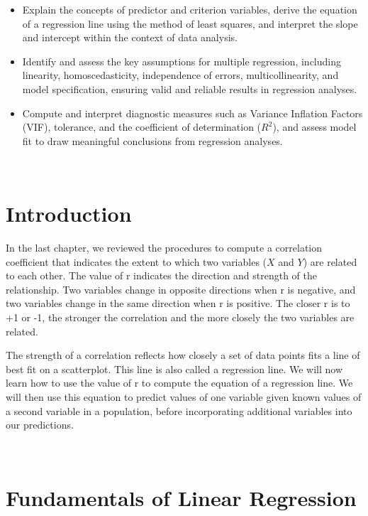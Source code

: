 \documentclass[
  letterpaper,
  DIV=11,
  numbers=noendperiod]{scrreprt}
\begin{document}
\begin{itemize}
\item
  Explain the concepts of predictor and criterion variables, derive the
  equation of a regression line using the method of least squares, and
  interpret the slope and intercept within the context of data analysis.
\item
  Identify and assess the key assumptions for multiple regression,
  including linearity, homoscedasticity, independence of errors,
  multicollinearity, and model specification, ensuring valid and
  reliable results in regression analyses.
\item
  Compute and interpret diagnostic measures such as Variance Inflation
  Factors (VIF), tolerance, and the coefficient of determination
  (\(R^2\)), and assess model fit to draw meaningful conclusions from
  regression analyses.
\end{itemize}

\,

\section{Introduction}\label{introduction-1}

In the last chapter, we reviewed the procedures to compute a correlation
coefficient that indicates the extent to which two variables (\(X\) and
\(Y\)) are related to each other. The value of r indicates the direction
and strength of the relationship. Two variables change in opposite
directions when r is negative, and two variables change in the same
direction when r is positive. The closer r is to +1 or -1, the stronger
the correlation and the more closely the two variables are related.\,\,

The strength of a correlation reflects how closely a set of data points
fits a line of best fit on a scatterplot. This line is also called a
regression line. We will now learn how to use the value of r to compute
the equation of a regression line. We will then use this equation to
predict values of one variable given known values of a second variable
in a population, before incorporating additional variables into our
predictions.

\,

\section{Fundamentals of Linear
Regression\,\,}\label{fundamentals-of-linear-regression}
\end{document}

